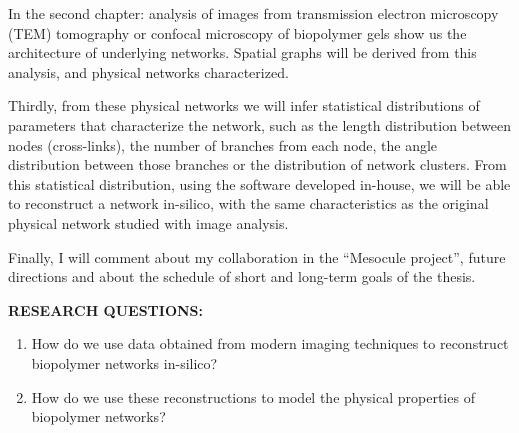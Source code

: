 \documentclass[11pt, a4paper, oneside]{Thesis} %
\begin{document}
In the second chapter: analysis of images from
transmission electron microscopy (TEM) tomography or confocal microscopy of
biopolymer gels show us the architecture of underlying networks.
Spatial graphs will be derived from this analysis, and
physical networks characterized.

Thirdly, from these physical networks we will infer statistical distributions of
parameters that characterize the network, such as the length distribution
between nodes (cross-links), the number of branches from each node, the angle
distribution between those branches or the distribution of network clusters.
From this statistical distribution, using the software developed in-house, we
will be able to reconstruct a network in-silico, with the same
characteristics as the original physical network studied with image analysis.

Finally, I will comment about my collaboration in the ``Mesocule project'',
future directions and about the schedule of short and long-term goals of the
thesis.

\textbf{RESEARCH QUESTIONS:}
\begin{enumerate}
  \item How do we use data obtained from modern imaging techniques to
  reconstruct biopolymer networks in-silico?
  \item How do we use these reconstructions to model the physical properties of
  biopolymer networks?
\end{enumerate}

\clearpage


\clearpage
     
\end{document}
